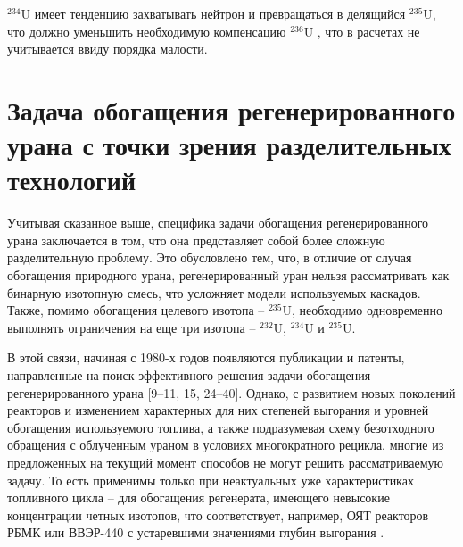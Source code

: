 $^{234}$U имеет тенденцию захватывать нейтрон и превращаться в делящийся $^{235}$U, что должно уменьшить необходимую компенсацию $^{236}$U \cite{dyachenkoIspolzovanieRegenerirovannogoUrana2012}, что в расчетах не учитывается ввиду порядка малости.


\section{Задача обогащения регенерированного урана с точки зрения разделительных технологий}

Учитывая сказанное выше, специфика задачи обогащения регенерированного урана заключается в том, что она представляет собой более сложную разделительную проблему.
Это обусловлено тем, что, в отличие от случая обогащения природного урана, регенерированный уран нельзя рассматривать как бинарную изотопную смесь, что усложняет модели используемых каскадов. Также, помимо обогащения целевого изотопа -- $^{235}$U, необходимо одновременно выполнять ограничения на еще три изотопа -- $^{232}$U, $^{234}$U и $^{235}$U.

В этой связи, начиная с 1980-х годов появляются публикации и патенты, направленные на поиск эффективного решения задачи обогащения регенерированного урана [9–11, 15, 24–40]. Однако, с развитием новых поколений реакторов и изменением характерных для них степеней выгорания и уровней обогащения используемого топлива, а также подразумевая схему безотходного обращения с облученным ураном в условиях многократного рецикла,  многие из предложенных на текущий момент способов не могут решить рассматриваемую задачу. То есть применимы только при неактуальных уже характеристиках топливного цикла -- для обогащения регенерата, имеющего невысокие концентрации четных изотопов, что соответствует, например, ОЯТ реакторов РБМК или ВВЭР-440 с устаревшими значениями глубин выгорания \cite{andrianovaPovyshenieVygoraniyaTopliva2008}.

